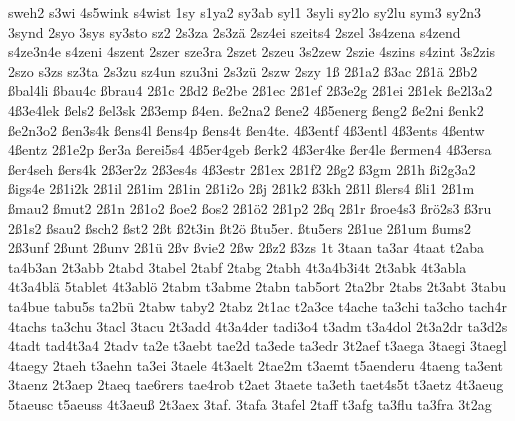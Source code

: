 {    sweh2
    s3wi
    4s5wink
    s4wist
    1sy
    s1ya2
    sy3ab
    syl1
    3syli
    sy2lo
    sy2lu
    sym3
    sy2n3
    3synd
    2syo
    3sys
    sy3sto
    sz2
    2s3za
    2s3zä
    2sz4ei
    szeits4
    2szel
    3s4zena
    s4zend
    s4ze3n4e
    s4zeni
    4szent
    2szer
    sze3ra
    2szet
    2szeu
    3s2zew
    2szie
    4szins
    s4zint
    3s2zis
    2szo
    s3zs
    sz3ta
    2s3zu
    sz4un
    szu3ni
    2s3zü
    2szw
    2szy
    1ß
    2ß1a2
    ß3ac
    2ß1ä
    2ßb2
    ßbal4li
    ßbau4c
    ßbrau4
    2ß1c
    2ßd2
    ße2be
    2ß1ec
    2ß1ef
    2ß3e2g
    2ß1ei
    2ß1ek
    ße2l3a2
    4ß3e4lek
    ßels2
    ßel3sk
    2ß3emp
    ß4en.
    ße2na2
    ßene2
    4ß5energ
    ßeng2
    ße2ni
    ßenk2
    ße2n3o2
    ßen3s4k
    ßens4l
    ßens4p
    ßens4t
    ßen4te.
    4ß3entf
    4ß3entl
    4ß3ents
    4ßentw
    4ßentz
    2ß1e2p
    ßer3a
    ßerei5s4
    4ß5er4geb
    ßerk2
    4ß3er4ke
    ßer4le
    ßermen4
    4ß3ersa
    ßer4seh
    ßers4k
    2ß3er2z
    2ß3es4s
    4ß3estr
    2ß1ex
    2ß1f2
    2ßg2
    ß3gm
    2ß1h
    ßi2g3a2
    ßigs4e
    2ß1i2k
    2ß1il
    2ß1im
    2ß1in
    2ß1i2o
    2ßj
    2ß1k2
    ß3kh
    2ß1l
    ßlers4
    ßli1
    2ß1m
    ßmau2
    ßmut2
    2ß1n
    2ß1o2
    ßoe2
    ßos2
    2ß1ö2
    2ß1p2
    2ßq
    2ß1r
    ßroe4s3
    ßrö2s3
    ß3ru
    2ß1s2
    ßsau2
    ßsch2
    ßst2
    2ßt
    ß2t3in
    ßt2ö
    ßtu5er.
    ßtu5ers
    2ß1ue
    2ß1um
    ßums2
    2ß3unf
    2ßunt
    2ßunv
    2ß1ü
    2ßv
    ßvie2
    2ßw
    2ßz2
    ß3zs
    1t
    3taan
    ta3ar
    4taat
    t2aba
    ta4b3an
    2t3abb
    2tabd
    3tabel
    2tabf
    2tabg
    2tabh
    4t3a4b3i4t
    2t3abk
    4t3abla
    4t3a4blä
    5tablet
    4t3ablö
    2tabm
    t3abme
    2tabn
    tab5ort
    2ta2br
    2tabs
    2t3abt
    3tabu
    ta4bue
    tabu5s
    ta2bü
    2tabw
    taby2
    2tabz
    2t1ac
    t2a3ce
    t4ache
    ta3chi
    ta3cho
    tach4r
    4tachs
    ta3chu
    3tacl
    3tacu
    2t3add
    4t3a4der
    tadi3o4
    t3adm
    t3a4dol
    2t3a2dr
    ta3d2s
    4tadt
    tad4t3a4
    2tadv
    ta2e
    t3aebt
    tae2d
    ta3ede
    ta3edr
    3t2aef
    t3aega
    3taegi
    3taegl
    4taegy
    2taeh
    t3aehn
    ta3ei
    3taele
    4t3aelt
    2tae2m
    t3aemt
    t5aenderu
    4taeng
    ta3ent
    3taenz
    2t3aep
    2taeq
    tae6rers
    tae4rob
    t2aet
    3taete
    ta3eth
    taet4s5t
    t3aetz
    4t3aeug
    5taeusc
    t5aeuss
    4t3aeuß
    2t3aex
    3taf.
    3tafa
    3tafel
    2taff
    t3afg
    ta3flu
    ta3fra
    3t2ag
}
